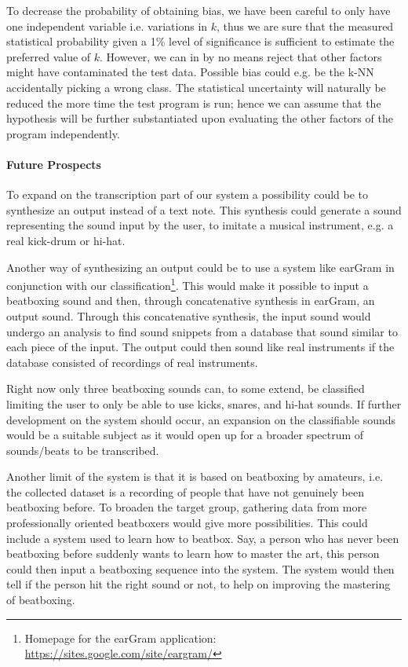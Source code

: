 To decrease the probability of obtaining bias, we have been careful to only have one independent variable i.e. variations in $k$, thus we are sure that the measured statistical probability given a 1\% level of significance is sufficient to estimate the preferred value of $k$. However, we can in by no means reject that other factors might have contaminated the test data. Possible bias could e.g. be the k-NN accidentally picking a wrong class. The statistical uncertainty will naturally be reduced the more time the test program is run; hence we can assume that the hypothesis will be further substantiated upon evaluating the other factors of the program independently.\\
\paragraph{Future Prospects} \hspace{0pt}


To expand on the transcription part of our system a possibility could be to synthesize an output instead of a text note. This synthesis could generate a sound representing the sound input by the user, to imitate a musical instrument, e.g. a real kick-drum or hi-hat.

Another way of synthesizing an output could be to use a system like earGram in conjunction with our classification\footnote{Homepage for the earGram application: \url{https://sites.google.com/site/eargram/}}. This would make it possible to input a beatboxing sound and then, through concatenative synthesis in earGram, an output sound. Through this concatenative synthesis, the input sound would undergo an analysis to find sound snippets from a database that sound similar to each piece of the input. The output could then sound like real instruments if the database consisted of recordings of real instruments.

Right now only three beatboxing sounds can, to some extend, be classified limiting the user to only be able to use kicks, snares, and hi-hat sounds. If further development on the system should occur, an expansion on the classifiable sounds would be a suitable subject as it would open up for a broader spectrum of sounds/beats to be transcribed.

Another limit of the system is that it is based on beatboxing by amateurs, i.e. the collected dataset is a recording of people that have not genuinely been beatboxing before. To broaden the target group, gathering data from more professionally oriented beatboxers would give more possibilities. This could include a system used to learn how to beatbox. Say, a person who has never been beatboxing before suddenly wants to learn how to master the art, this person could then input a beatboxing sequence into the system. The system would then tell if the person hit the right sound or not, to help on improving the mastering of beatboxing.


